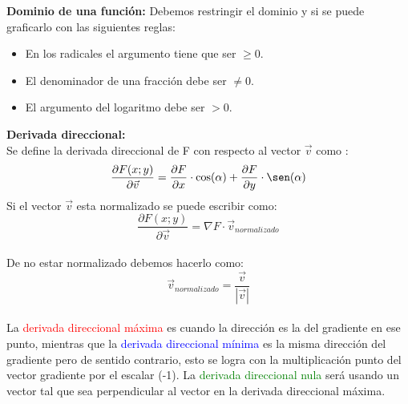 \documentclass[12pt,a4paper]{article}
\begin{document}
  \textbf{Dominio de una función:} Debemos restringir el dominio y si se puede graficarlo con las siguientes reglas:
  \begin{itemize}
     \item En los radicales el argumento tiene que ser $ \geq 0$.
     \item El denominador de una fracción debe ser $\neq 0$.
     \item El argumento del logaritmo debe ser $> 0$.

  \end{itemize}

  \textbf{Derivada direccional:}\\
  Se define la derivada direccional de F con respecto al vector $\vec{v}$ como :
  $$\dfrac{\partial F(x;y)}{\partial \vec{v}} = \dfrac{\partial F}{\partial x} \cdot \cos(\alpha)+ \dfrac{\partial F }{\partial y} \cdot \sen(\alpha) $$
  Si el vector $\vec{v}$ esta normalizado se puede escribir como:
  $$\dfrac{\partial F(x;y)}{\partial \vec{v}}=\nabla F \cdot \vec{v}_{normalizado}$$\\
  De no estar normalizado debemos hacerlo como:
  $$\vec{v}_{normalizado}= \dfrac{\vec{v}}{|\vec{v}|}$$
  \\
  La \textcolor{red}{derivada direccional máxima} es cuando la dirección es la del gradiente en ese punto, mientras que la \textcolor{blue}{derivada direccional mínima} es la misma dirección del gradiente pero de sentido contrario, esto se logra con la multiplicación punto del vector gradiente por el escalar (-1). La \textcolor{green}{derivada direccional nula} será usando un vector tal que sea perpendicular al vector en la derivada direccional máxima.\\
\end{document}
